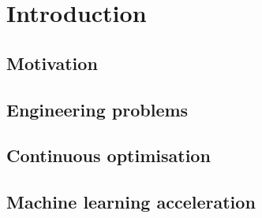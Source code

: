 \documentclass[../main.tex]{subfiles}
\begin{document}
\chapter{Introduction}

\section{Motivation}

\section{Engineering problems}

\section{Continuous optimisation}

\section{Machine learning acceleration}
\end{document}
